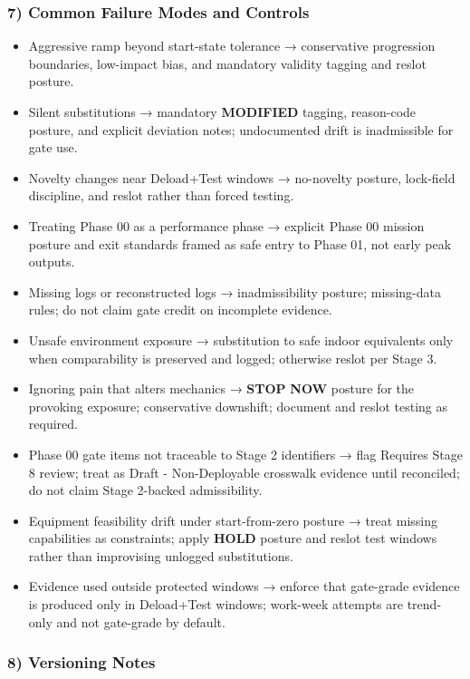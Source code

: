 \documentclass[10pt]{article}
\begin{document}
\subsubsection*{7) Common Failure Modes and Controls}

\begin{itemize}
\item Aggressive ramp beyond start-state tolerance → conservative progression boundaries, low-impact bias, and mandatory validity tagging and reslot posture.
\item Silent substitutions → mandatory \textbf{MODIFIED} tagging, reason-code posture, and explicit deviation notes; undocumented drift is inadmissible for gate use.
\item Novelty changes near Deload+Test windows → no-novelty posture, lock-field discipline, and reslot rather than forced testing.
\item Treating Phase 00 as a performance phase → explicit Phase 00 mission posture and exit standards framed as safe entry to Phase 01, not early peak outputs.
\item Missing logs or reconstructed logs → inadmissibility posture; missing-data rules; do not claim gate credit on incomplete evidence.
\item Unsafe environment exposure → substitution to safe indoor equivalents only when comparability is preserved and logged; otherwise reslot per Stage 3.
\item Ignoring pain that alters mechanics → \textbf{STOP} \textbf{NOW} posture for the provoking exposure; conservative downshift; document and reslot testing as required.
\item Phase 00 gate items not traceable to Stage 2 identifiers → flag Requires Stage 8 review; treat as Draft - Non-Deployable crosswalk evidence until reconciled; do not claim Stage 2-backed admissibility.
\item Equipment feasibility drift under start-from-zero posture → treat missing capabilities as constraints; apply \textbf{HOLD} posture and reslot test windows rather than improvising unlogged substitutions.
\item Evidence used outside protected windows → enforce that gate-grade evidence is produced only in Deload+Test windows; work-week attempts are trend-only and not gate-grade by default.
\end{itemize}

\subsubsection*{8) Versioning Notes}
\end{document}
